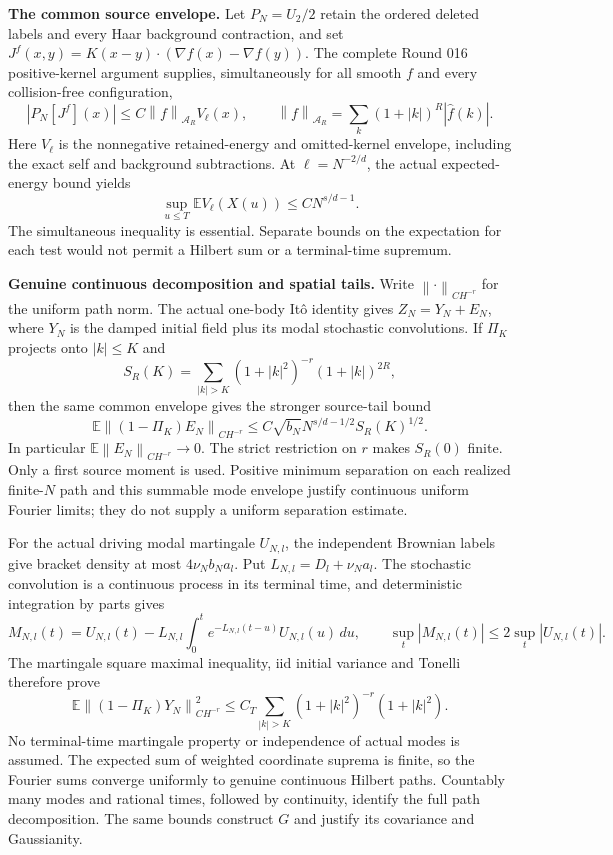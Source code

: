 \documentclass[11pt]{article}
\newcommand{\E}{\mathbb E}
\newcommand{\norm}[1]{\left\|#1\right\|}
\begin{document}
\noindent\textbf{The common source envelope.}
Let $P_N=U_2/2$ retain the ordered deleted labels and every Haar background contraction, and set $J^f(x,y)=K(x-y)\cdot(\nabla f(x)-\nabla f(y))$. The complete Round 016 positive-kernel argument supplies, simultaneously for all smooth $f$ and every collision-free configuration,
\[
 |P_N[J^f](x)|\le C\norm f_{\mathcal A_R}V_{\ell}(x),
 \qquad \norm f_{\mathcal A_R}=\sum_k(1+|k|)^R|\widehat f(k)|.
\]
Here $V_\ell$ is the nonnegative retained-energy and omitted-kernel envelope, including the exact self and background subtractions. At $\ell=N^{-2/d}$, the actual expected-energy bound yields
\[
 \sup_{u\le T}\E V_\ell(X(u))\le C N^{s/d-1}.
\]
The simultaneous inequality is essential. Separate bounds on the expectation for each test would not permit a Hilbert sum or a terminal-time supremum.

\noindent\textbf{Genuine continuous decomposition and spatial tails.}
Write $\norm{\cdot}_{C H^{-r}}$ for the uniform path norm. The actual one-body It\^o identity gives $Z_N=Y_N+E_N$, where $Y_N$ is the damped initial field plus its modal stochastic convolutions. If $\Pi_K$ projects onto $|k|\le K$ and
\[
 S_R(K)=\sum_{|k|>K}(1+|k|^2)^{-r}(1+|k|)^{2R},
\]
then the same common envelope gives the stronger source-tail bound
\[
 \E\norm{(1-\Pi_K)E_N}_{C H^{-r}}
 \le C\sqrt{b_N}N^{s/d-1/2}S_R(K)^{1/2}.
\]
In particular $\E\norm{E_N}_{C H^{-r}}\to0$. The strict restriction on $r$ makes $S_R(0)$ finite. Only a first source moment is used. Positive minimum separation on each realized finite-$N$ path and this summable mode envelope justify continuous uniform Fourier limits; they do not supply a uniform separation estimate.

For the actual driving modal martingale $U_{N,l}$, the independent Brownian labels give bracket density at most $4\nu_Nb_Na_l$. Put $L_{N,l}=D_l+\nu_Na_l$. The stochastic convolution is a continuous process in its terminal time, and deterministic integration by parts gives
\[
 M_{N,l}(t)=U_{N,l}(t)-L_{N,l}\int_0^t
 e^{-L_{N,l}(t-u)}U_{N,l}(u)\,du,
 \qquad \sup_t|M_{N,l}(t)|\le2\sup_t|U_{N,l}(t)|.
\]
The martingale square maximal inequality, iid initial variance and Tonelli therefore prove
\[
 \E\norm{(1-\Pi_K)Y_N}_{C H^{-r}}^2
 \le C_T\sum_{|k|>K}(1+|k|^2)^{-r}(1+|k|^2).
\]
No terminal-time martingale property or independence of actual modes is assumed. The expected sum of weighted coordinate suprema is finite, so the Fourier sums converge uniformly to genuine continuous Hilbert paths. Countably many modes and rational times, followed by continuity, identify the full path decomposition. The same bounds construct $G$ and justify its covariance and Gaussianity.
\end{document}
